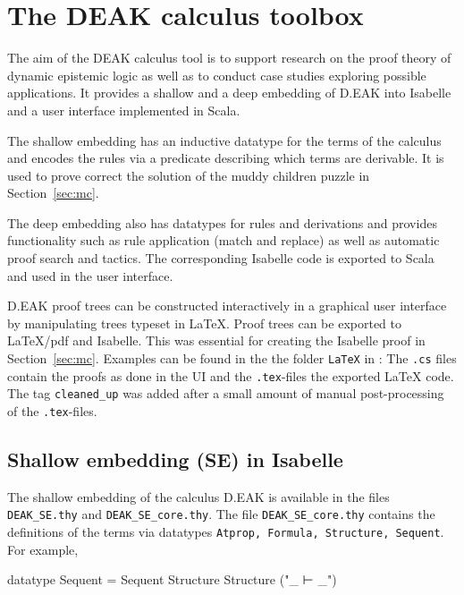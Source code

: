 \documentclass[runningheads,a4paper]{llncs}
\begin{document}
\section{The DEAK calculus toolbox}\label{sec:deak-tool}

The aim of the DEAK calculus tool \cite{Balco:DEAK} is to support research on the proof theory of dynamic epistemic logic as well as to conduct case studies exploring possible applications.  It provides a shallow and a deep embedding of D.EAK into Isabelle and a user interface implemented in Scala. 

The shallow embedding has an inductive datatype for the terms of the calculus and encodes the rules via a predicate describing which terms are derivable. It is used to prove correct the solution of the muddy children puzzle in Section~\ref{sec:mc}.

The deep embedding also has datatypes for rules and derivations and provides functionality such as rule application (match and replace) as well as automatic proof search and tactics. The corresponding Isabelle code is exported to Scala and used in the user interface.

D.EAK proof trees can be constructed interactively in a graphical user interface  by manipulating trees typeset in LaTeX. Proof trees can be exported to LaTeX/pdf and Isabelle.   This was essential for creating the Isabelle proof in Section~\ref{sec:mc}. Examples can be found in the the folder \texttt{LaTeX} in \cite{Balco:MC}: The \texttt{.cs} files contain the proofs as done in the UI and the \texttt{.tex}-files the exported LaTeX code. The tag \texttt{cleaned\_up} was added after a small amount of manual post-processing of the \texttt{.tex}-files.




\subsection{Shallow embedding (SE)  in Isabelle}\label{sec:se}

The shallow embedding of the calculus D.EAK is available in the files \texttt{DEAK\_SE.thy} and \texttt{DEAK\_SE\_core.thy}. The file \texttt{DEAK\_SE\_core.thy} contains the definitions of the terms via datatypes \texttt{Atprop, Formula, Structure, Sequent}. For example,

\begin{pyglist}[language = isabelle]
datatype Sequent = Sequent Structure Structure ("_ ⊢ _")
\end{pyglist}
\end{document}

